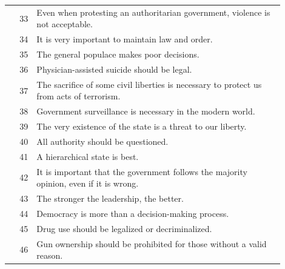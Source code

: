 \documentclass[11pt]{article}
\begin{document}
\begin{longtable}{r p{0.9\linewidth}}
\rowcolor{evCivil} 33 & Even when protesting an authoritarian government, violence is not acceptable. \\
\rowcolor{evCivil} 34 & It is very important to maintain law and order. \\
\rowcolor{evCivil} 35 & The general populace makes poor decisions. \\
\rowcolor{evCivil} 36 & Physician-assisted suicide should be legal. \\
\rowcolor{evCivil} 37 & The sacrifice of some civil liberties is necessary to protect us from acts of terrorism. \\
\rowcolor{evCivil} 38 & Government surveillance is necessary in the modern world. \\
\rowcolor{evCivil} 39 & The very existence of the state is a threat to our liberty. \\
\rowcolor{evCivil} 40 & All authority should be questioned. \\
\rowcolor{evCivil} 41 & A hierarchical state is best. \\
\rowcolor{evCivil} 42 & It is important that the government follows the majority opinion, even if it is wrong. \\
\rowcolor{evCivil} 43 & The stronger the leadership, the better. \\
\rowcolor{evCivil} 44 & Democracy is more than a decision-making process. \\
\rowcolor{evCivil} 45 & Drug use should be legalized or decriminalized. \\
\rowcolor{evCivil} 46 & Gun ownership should be prohibited for those without a valid reason. \\


\end{longtable}
\end{document}
